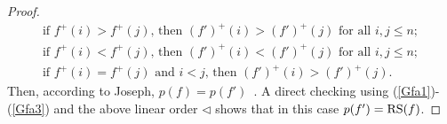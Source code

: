 \documentclass[10pt]{amsart}\oddsidemargin -1mm \evensidemargin -1mm \topmargin -15mm\headheight5mm \headsep 3.5mm \textheight 245mm\textwidth 170mm %
\theoremstyle{definition}\newtheorem{theorem}{Theorem}[section]\newtheorem{lemma}[theorem]{Lemma}\newtheorem{remark}[theorem]{Remark}\newtheorem{proposition}[theorem]{Proposition}\newtheorem{corollary}[theorem]{Corollary}\newtheorem{definition}[theorem]{Definition}\newtheorem{Ex}[theorem]{Example}
\begin{document}
\begin{proof}



\begin{gather}\mbox{if~}f^+(i)> f^+(j)\mbox{,~then~}(f')^+(i)>(f')^+(j)\mbox{~for~all~}i, j\le n;\label{Gfa1}\\
\mbox{if~}f^+(i)< f^+(j)\mbox{,~then~}(f')^+(i)<(f')^+(j)\mbox{~for~all~}i, j\le n;\\
\mbox{if~}f^+(i)=f^+(j)\mbox{~and~}i<j\mbox{,~then~}(f')^+(i)>(f')^+(j).\label{Gfa3}\end{gather}
Then, according to Joseph, $p(f)=p(f')$~\cite[Section 2.4]{Jo2}. A direct checking using (\ref{Gfa1})-(\ref{Gfa3}) and the above linear order $\triangleleft$ shows that in this case $p(f')=\operatorname{\mathrm{RS}}(f)$.



\end{proof}
\end{document}

